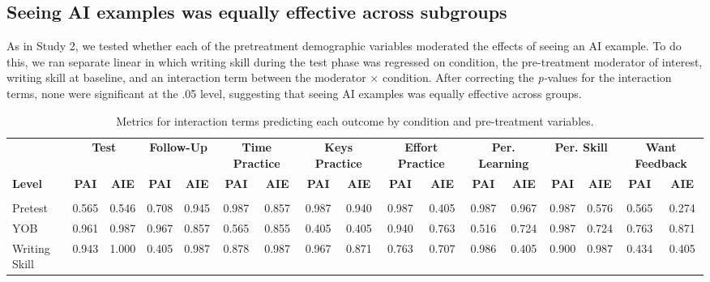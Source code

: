 \documentclass[11pt]{report}
\begin{document}
\begin{append}
\subsection{Seeing AI examples was equally effective across subgroups}
As in Study 2, we tested whether each of the pretreatment demographic variables moderated the effects of seeing an AI example. To do this, we ran separate linear in which writing skill during the test phase was regressed on condition, the pre-treatment moderator of interest, writing skill at baseline, and an interaction term between the moderator $\times$ condition. After correcting the \textit{p-}values for the interaction terms, none were significant at the .05 level, suggesting that seeing AI examples was equally effective across groups.

\begin{table}[ht]
    \centering
    \caption{Metrics for interaction terms predicting each outcome by condition and pre-treatment variables.}
    \label{tab:interactions3}
    \begin{tabular}{@{\extracolsep{-4pt}}lcccccccccccccccc}
    \toprule
    & \multicolumn{2}{c}{\textbf{Test}} & \multicolumn{2}{c}{\textbf{Follow-Up}} & \multicolumn{2}{c}{\textbf{Time Practice}} & \multicolumn{2}{c}{\textbf{Keys Practice}} & \multicolumn{2}{c}{\textbf{Effort Practice}} & \multicolumn{2}{c}{\textbf{Per. Learning}} & \multicolumn{2}{c}{\textbf{Per. Skill}} & \multicolumn{2}{c}{\textbf{Want Feedback}} \\ 
    \cmidrule(lr){2-3} \cmidrule(lr){4-5} \cmidrule(lr){6-7} \cmidrule(lr){8-9} \cmidrule(lr){10-11} \cmidrule(lr){12-13} \cmidrule(lr){14-15} \cmidrule(lr){16-17}
    \textbf{Level} & \textbf{PAI} & \textbf{AIE} & \textbf{PAI} & \textbf{AIE} & \textbf{PAI} & \textbf{AIE} & \textbf{PAI} & \textbf{AIE} & \textbf{PAI} & \textbf{AIE} & \textbf{PAI} & \textbf{AIE} & \textbf{PAI} & \textbf{AIE} & \textbf{PAI} & \textbf{AIE} \\ 
    \midrule
    \addlinespace[2.5pt]
    \multicolumn{17}{l}{\textbf{Continuous Moderators}} \\ 
    \midrule
    Pretest & 0.565 & 0.546 & 0.708 & 0.945 & 0.987 & 0.857 & 0.987 & 0.940 & 0.987 & 0.405 & 0.987 & 0.967 & 0.987 & 0.576 & 0.565 & 0.274 \\ 
    YOB & 0.961 & 0.987 & 0.967 & 0.857 & 0.565 & 0.855 & 0.405 & 0.405 & 0.940 & 0.763 & 0.516 & 0.724 & 0.987 & 0.724 & 0.763 & 0.871 \\ 
    Writing Skill & 0.943 & 1.000 & 0.405 & 0.987 & 0.878 & 0.987 & 0.967 & 0.871 & 0.763 & 0.707 & 0.986 & 0.405 & 0.900 & 0.987 & 0.434 & 0.405 \\ 

\end{tabular}
\end{table}
\end{append}
\end{document}
